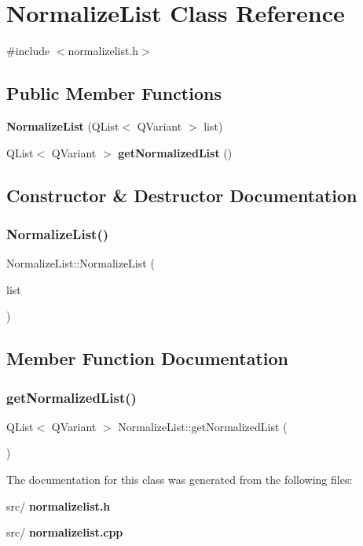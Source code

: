 \section{Normalize\+List Class Reference}
\label{class_normalize_list}


{\ttfamily \#include $<$normalizelist.\+h$>$}

\subsection*{Public Member Functions}
\begin{DoxyCompactItemize}
\item 
\textbf{ Normalize\+List} (Q\+List$<$ Q\+Variant $>$ list)
\item 
Q\+List$<$ Q\+Variant $>$ \textbf{ get\+Normalized\+List} ()
\end{DoxyCompactItemize}


\subsection{Constructor \& Destructor Documentation}
\mbox{\label{class_normalize_list_aa667b3e24fc51f14f5c976a97ff64b8d}} 
\subsubsection{Normalize\+List()}
{\footnotesize\ttfamily Normalize\+List\+::\+Normalize\+List (\begin{DoxyParamCaption}\item[{Q\+List$<$ Q\+Variant $>$}]{list }\end{DoxyParamCaption})}



\subsection{Member Function Documentation}
\mbox{\label{class_normalize_list_a32099536cd726bd5cb4024e9af8c85ff}} 
\subsubsection{get\+Normalized\+List()}
{\footnotesize\ttfamily Q\+List$<$ Q\+Variant $>$ Normalize\+List\+::get\+Normalized\+List (\begin{DoxyParamCaption}{ }\end{DoxyParamCaption})}



The documentation for this class was generated from the following files\+:\begin{DoxyCompactItemize}
\item 
src/\textbf{ normalizelist.\+h}\item 
src/\textbf{ normalizelist.\+cpp}\end{DoxyCompactItemize}
